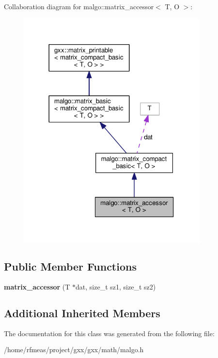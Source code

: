 Collaboration diagram for malgo\+:\+:matrix\+\_\+accessor$<$ T, O $>$\+:
\nopagebreak
\begin{figure}[H]
\begin{center}
\leavevmode
\includegraphics[width=273pt]{classmalgo_1_1matrix__accessor__coll__graph}
\end{center}
\end{figure}
\subsection*{Public Member Functions}
\begin{DoxyCompactItemize}
\item 
{\bfseries matrix\+\_\+accessor} (T $\ast$dat, size\+\_\+t sz1, size\+\_\+t sz2)\hypertarget{classmalgo_1_1matrix__accessor_a4b742cff83500e49af5f7fc84603277f}{}\label{classmalgo_1_1matrix__accessor_a4b742cff83500e49af5f7fc84603277f}

\end{DoxyCompactItemize}
\subsection*{Additional Inherited Members}


The documentation for this class was generated from the following file\+:\begin{DoxyCompactItemize}
\item 
/home/rfmeas/project/gxx/gxx/math/malgo.\+h\end{DoxyCompactItemize}
